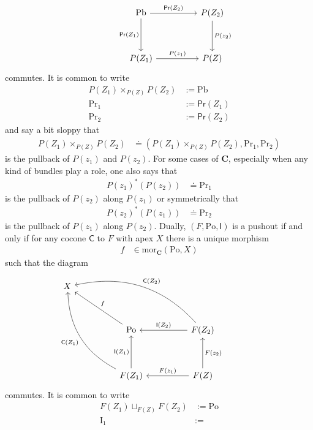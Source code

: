 \begin{exa}
\begin{enumerate}
\[\begin{tikzcd}[sep=huge]
  &
  \mathrm{Pb}
  \arrow{r}{\mathsf{Pr}(Z_{2})}
  \arrow[swap]{d}{\mathsf{Pr}(Z_{1})}
  &
  P(Z_{2})
  \arrow{d}{P(z_{2})}
  \\
  &
  P(Z_{1})
  \arrow{r}{P(z_{1})}
  &
  P(Z)
\end{tikzcd}
\]
commutes. It is common to write
\begin{align*}
  P(Z_{1})
  \times_{P(Z)}
  P(Z_{2})
  &:=
  \mathrm{Pb}
  \\
  \mathrm{Pr}_{1}
  &:=
  \mathsf{Pr}(Z_{1})
  \\
  \mathrm{Pr}_{2}
  &:=
  \mathsf{Pr}(Z_{2})
\end{align*}
and say a bit sloppy that
\begin{align*}
  P(Z_{1})
  \times_{P(Z)}
  P(Z_{2})
  &\doteq
  \left(
    P(Z_{1})
    \times_{P(Z)}
    P(Z_{2}),
    \mathrm{Pr}_{1},
    \mathrm{Pr}_{2}
  \right)
\end{align*}
is the pullback of $P(z_{1})$ and $P(z_{2})$. For some cases of $\mathbf{C}$, especially when any kind of bundles play a role, one also says that
\begin{align*}
  P(z_{1})^{\ast}(P(z_{2}))
  &\doteq
  \mathrm{Pr}_{1}
\end{align*}
is the pullback of $P(z_{2})$ along $P(z_{1})$ or symmetrically that
\begin{align*}
  P(z_{2})^{\ast}(P(z_{1}))
  &\doteq
  \mathrm{Pr}_{2}
\end{align*}
is the pullback of $P(z_{1})$ along $P(z_{2})$. Dually, $(F,\mathrm{Po},\mathsf{I})$ is a pushout if and only if for any cocone $\mathsf{C}$ to $F$ with apex $X$ there is a unique morphism
\begin{align*}
  f
  &\in
  \mathrm{mor}_{\mathbf{C}}(\mathrm{Po},X)
\end{align*}
such that the diagram
\[
\begin{tikzcd}[sep=huge]
  X
  &
  &
  &
  \\
  &
  \mathrm{Po}
  \arrow[swap]{ul}{f}
  &
  F(Z_{2})
  \arrow[swap]{l}{\mathsf{I}(Z_{2})}
  \arrow[swap,bend right=30]{ull}{\mathsf{C}(Z_{2})}
  \\
  &
  F(Z_{1})
  \arrow{u}{\mathsf{I}(Z_{1})}
  \arrow[bend left=30]{uul}{\mathsf{C}(Z_{1})}
  &
  F(Z)
  \arrow[swap]{u}{F(z_{2})}
  \arrow[swap]{l}{F(z_{1})}
\end{tikzcd}
\]
commutes. It is common to write
\begin{align*}
  F(Z_{1})
  \sqcup_{F(Z)}
  F(Z_{2})
  &:=
  \mathrm{Po}
  \\
  \mathrm{I}_{1}
  &:=

\end{align*}
\end{enumerate}
\end{exa}

